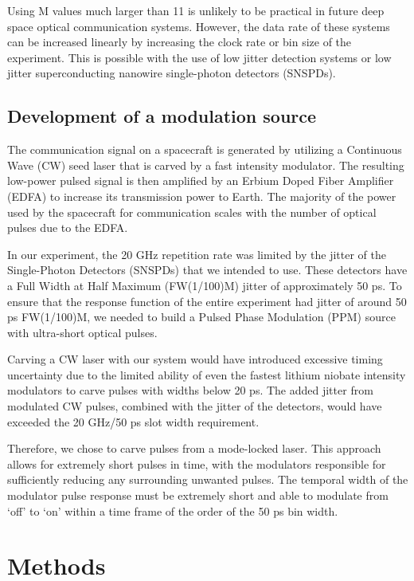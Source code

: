 \documentclass[11pt]{caltech_thesis} %
\begin{document}
Using M values much larger than 11 is unlikely to be practical in future
deep space optical communication systems. However, the data rate of
these systems can be increased linearly by increasing the clock rate or
bin size of the experiment. This is possible with the use of low jitter
detection systems or low jitter superconducting nanowire single-photon
detectors (SNSPDs).

\hypertarget{development-of-a-modulation-source}{%
\subsection{Development of a modulation
source}\label{development-of-a-modulation-source}}

The communication signal on a spacecraft is generated by utilizing a
Continuous Wave (CW) seed laser that is carved by a fast intensity
modulator. The resulting low-power pulsed signal is then amplified by an
Erbium Doped Fiber Amplifier (EDFA) to increase its transmission power
to Earth. The majority of the power used by the spacecraft for
communication scales with the number of optical pulses due to the EDFA.

In our experiment, the 20 GHz repetition rate was limited by the jitter
of the Single-Photon Detectors (SNSPDs) that we intended to use. These
detectors have a Full Width at Half Maximum (FW(1/100)M) jitter of
approximately 50 ps. To ensure that the response function of the entire
experiment had jitter of around 50 ps FW(1/100)M, we needed to build a
Pulsed Phase Modulation (PPM) source with ultra-short optical pulses.

Carving a CW laser with our system would have introduced excessive
timing uncertainty due to the limited ability of even the fastest
lithium niobate intensity modulators to carve pulses with widths below
20 ps. The added jitter from modulated CW pulses, combined with the
jitter of the detectors, would have exceeded the 20 GHz/50 ps slot width
requirement.

Therefore, we chose to carve pulses from a mode-locked laser. This
approach allows for extremely short pulses in time, with the modulators
responsible for sufficiently reducing any surrounding unwanted pulses.
The temporal width of the modulator pulse response must be extremely
short and able to modulate from `off' to `on' within a time frame of the
order of the 50 ps bin width.

\hypertarget{methods}{%
\section{Methods}\label{methods}}
\end{document}
